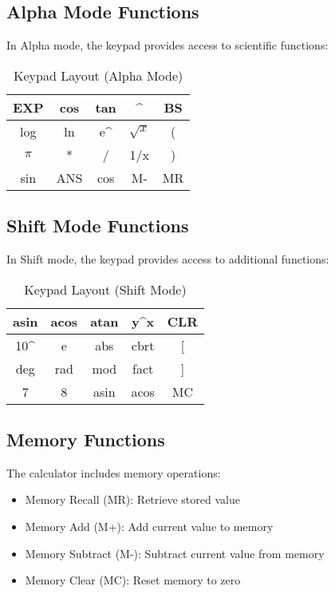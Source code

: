 \documentclass{article}
\begin{document}
\subsection{Alpha Mode Functions}
In Alpha mode, the keypad provides access to scientific functions:

\begin{table}[h]
\centering
\begin{tabular}{|c|c|c|c|c|}
\hline
EXP & cos & tan & \textasciicircum & BS \\
\hline
log & ln & e\textasciicircum & $\sqrt{x}$ & ( \\
\hline
$\pi$ & * & / & 1/x & ) \\

\hline
sin & ANS & cos & M- & MR \\
\hline
\end{tabular}
\caption{Keypad Layout (Alpha Mode)}
\end{table}

\subsection{Shift Mode Functions}
In Shift mode, the keypad provides access to additional functions:

\begin{table}[h]
\centering
\begin{tabular}{|c|c|c|c|c|}
\hline
asin & acos & atan & y\textasciicircum x & CLR \\
\hline
10\textasciicircum & e & abs & cbrt & [ \\
\hline
deg & rad & mod & fact & ] \\
\hline
7 & 8 & asin & acos & MC \\
\hline
\end{tabular}
\caption{Keypad Layout (Shift Mode)}
\end{table}

\subsection{Memory Functions}
The calculator includes memory operations:
\begin{itemize}
    \item Memory Recall (MR): Retrieve stored value
    \item Memory Add (M+): Add current value to memory
    \item Memory Subtract (M-): Subtract current value from memory
    \item Memory Clear (MC): Reset memory to zero
\end{itemize}
\end{document}
